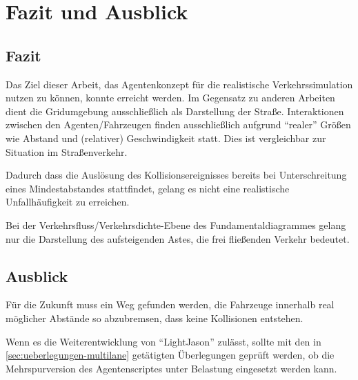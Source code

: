 \section{Fazit und Ausblick}
\label{sec:fazit-ausblick}

\subsection{Fazit}
\label{sec:fazit}

Das Ziel dieser Arbeit, das Agentenkonzept für die realistische Verkehrssimulation nutzen zu können, konnte erreicht werden.
Im Gegensatz zu anderen Arbeiten dient die Gridumgebung ausschließlich als Darstellung der Straße.
Interaktionen zwischen den Agenten/Fahrzeugen finden ausschließlich aufgrund \enquote{realer} Größen wie Abstand und (relativer) Geschwindigkeit statt.
Dies ist vergleichbar zur Situation im Straßenverkehr.

Dadurch dass die Auslösung des Kollisionsereignisses bereits bei Unterschreitung eines Mindestabstandes stattfindet, gelang es nicht eine realistische Unfallhäufigkeit zu erreichen.

Bei der Verkehrsfluss/Verkehrsdichte-Ebene des Fundamentaldiagrammes gelang nur die Darstellung des aufsteigenden Astes, die frei fließenden Verkehr bedeutet.






\subsection{Ausblick}
\label{sec:ausblick}

Für die Zukunft muss ein Weg gefunden werden, die Fahrzeuge innerhalb real möglicher Abstände so abzubremsen, dass keine Kollisionen entstehen. 

Wenn es die Weiterentwicklung von \enquote{LightJason} zulässt, sollte mit den in \cref{sec:ueberlegungen-multilane} getätigten Überlegungen geprüft werden, ob die Mehrspurversion des Agentenscriptes unter Belastung eingesetzt werden kann.

